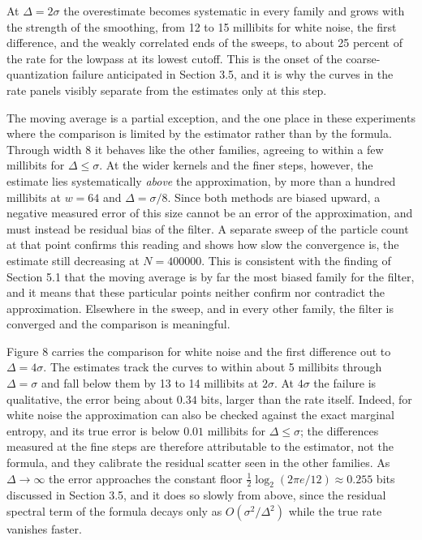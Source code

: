 \documentclass[11pt]{article}
\begin{document}
At \(\Delta = 2\sigma\) the overestimate becomes systematic in every family and grows with the strength of the smoothing, from 12 to 15 millibits for white noise, the first difference, and the weakly correlated ends of the sweeps, to about 25 percent of the rate for the lowpass at its lowest cutoff. This is the onset of the coarse-quantization failure anticipated in Section 3.5, and it is why the curves in the rate panels visibly separate from the estimates only at this step.

The moving average is a partial exception, and the one place in these experiments where the comparison is limited by the estimator rather than by the formula. Through width 8 it behaves like the other families, agreeing to within a few millibits for \(\Delta \le \sigma\). At the wider kernels and the finer steps, however, the estimate lies systematically \emph{above} the approximation, by more than a hundred millibits at \(w = 64\) and \(\Delta = \sigma/8\). Since both methods are biased upward, a negative measured error of this size cannot be an error of the approximation, and must instead be residual bias of the filter. A separate sweep of the particle count at that point confirms this reading and shows how slow the convergence is, the estimate still decreasing at \(N = 400000\). This is consistent with the finding of Section 5.1 that the moving average is by far the most biased family for the filter, and it means that these particular points neither confirm nor contradict the approximation. Elsewhere in the sweep, and in every other family, the filter is converged and the comparison is meaningful.

Figure 8 carries the comparison for white noise and the first difference out to \(\Delta = 4\sigma\). The estimates track the curves to within about 5 millibits through \(\Delta = \sigma\) and fall below them by 13 to 14 millibits at \(2\sigma\). At \(4\sigma\) the failure is qualitative, the error being about \(0.34\) bits, larger than the rate itself. Indeed, for white noise the approximation can also be checked against the exact marginal entropy, and its true error is below \(0.01\) millibits for \(\Delta \le \sigma\); the differences measured at the fine steps are therefore attributable to the estimator, not the formula, and they calibrate the residual scatter seen in the other families. As \(\Delta \to \infty\) the error approaches the constant floor \(\tfrac12\log_2(2\pi e/12) \approx 0.255\) bits discussed in Section 3.5, and it does so slowly from above, since the residual spectral term of the formula decays only as \(O(\sigma^2/\Delta^2)\) while the true rate vanishes faster.
\end{document}
